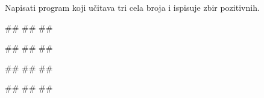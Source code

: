 \begin{Exercise}[label=KT_NG_04] 
Napisati program koji učitava tri cela broja i ispisuje zbir pozitivnih.

\begin{miditest}
\begin{upotreba}{1}
#\naslovInt#
##
##
\end{upotreba}
\end{miditest}
\begin{miditest}
\begin{upotreba}{2}
#\naslovInt#
##
##
\end{upotreba}
\end{miditest}

\begin{miditest}
\begin{upotreba}{3}
#\naslovInt#
##
##
\end{upotreba}
\end{miditest}
\begin{miditest}
\begin{upotreba}{4}
#\naslovInt#
##
##
\end{upotreba}
\end{miditest}

\end{Exercise}
\ifresenja
 \begin{Answer}[ref=KT_NG_04]
\end{Answer}
\fi


